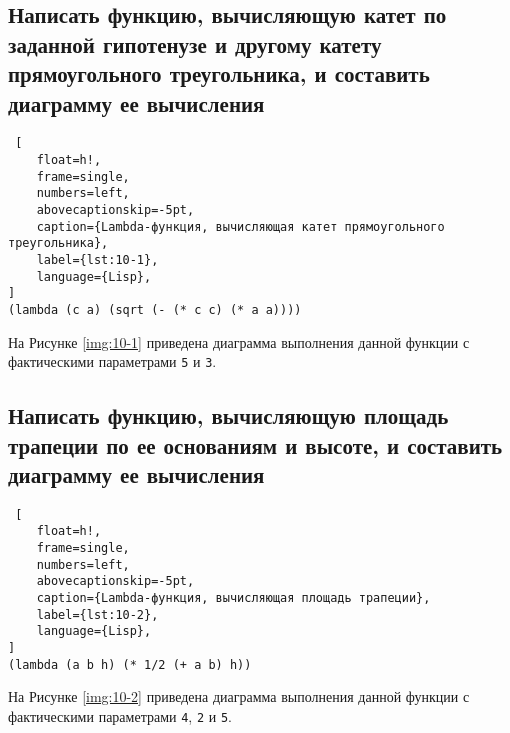 \subsection*{Написать функцию, вычисляющую катет по заданной гипотенузе и другому катету прямоугольного треугольника, и составить диаграмму ее вычисления}

\begin{lstlisting} [
	float=h!,
	frame=single,
	numbers=left,
	abovecaptionskip=-5pt,
	caption={Lambda-функция, вычисляющая катет прямоугольного треугольника},
	label={lst:10-1},
	language={Lisp},
]
(lambda (c a) (sqrt (- (* c c) (* a a))))
\end{lstlisting}

На Рисунке \ref{img:10-1} приведена диаграмма выполнения данной функции с фактическими параметрами \texttt{5} и \texttt{3}.


\subsection*{Написать функцию, вычисляющую площадь трапеции по ее основаниям и высоте, и составить диаграмму ее вычисления}

\begin{lstlisting} [
	float=h!,
	frame=single,
	numbers=left,
	abovecaptionskip=-5pt,
	caption={Lambda-функция, вычисляющая площадь трапеции},
	label={lst:10-2},
	language={Lisp},
]
(lambda (a b h) (* 1/2 (+ a b) h))
\end{lstlisting}

На Рисунке \ref{img:10-2} приведена диаграмма выполнения данной функции с фактическими параметрами \texttt{4}, \texttt{2} и \texttt{5}.

